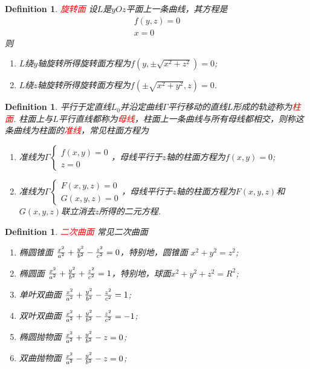 \documentclass{article}
\newtheorem{definition}[theorem]{Definition}
\newcommand{\redt}[1]{\textcolor{red}{#1}}
\begin{document}
\begin{definition}
\rm \redt{旋转面} 设$L$是$yOz$平面上一条曲线，其方程是
$$
\begin{array}{ll}
f(y,z) = 0 \\
x= 0
\end{array}
$$
则
\begin{enumerate}
	\item $L$绕$y$轴旋转所得旋转面方程为$f(y,\pm \sqrt{x^2+z^2}) = 0$;
	\item $L$绕$z$轴旋转所得旋转面方程为$f(\pm \sqrt{x^2 + y^2},z) = 0$. 
\end{enumerate}
\end{definition}

\begin{definition}
\rm 平行于定直线$L_0$并沿定曲线$\Gamma$平行移动的直线$L$形成的轨迹称为\redt{柱面}. 柱面上与$L$平行直线都称为\redt{母线}，柱面上一条曲线与所有母线都相交，则称这条曲线为柱面的\redt{准线}，常见柱面方程为
\begin{enumerate}
	\item 准线为$\Gamma \left\{ \begin{array}{ll} f(x,y) = 0 \\ z = 0 \end{array} \right.$，母线平行于$z$轴的柱面方程为$f(x,y) = 0$;
	\item 准线为$\Gamma \left\{\begin{array}{ll} F(x,y,z) = 0 \\ G(x,y,z) = 0 \end{array}\right.$，母线平行于$z$轴的柱面方程为$F(x,y,z)$和$G(x,y,z)$联立消去$z$所得的二元方程. 
\end{enumerate}
\end{definition}

\begin{definition}
\rm \redt{二次曲面} 常见二次曲面
\begin{enumerate}
	\item 椭圆锥面 ${x^{2} \over a^{2}}+{y^{2} \over b^{2}}-{z^{2} \over c^{2}}=0$，特别地，圆锥面 $x^2 + y^2 = z^2$;
	\item 椭圆面 ${x^{2} \over a^{2}}+{y^{2} \over b^{2}}+{z^{2} \over c^{2}}=1$，特别地，球面$x^2+y^2+z^2 = R^2$;
	\item 单叶双曲面 ${x^{2} \over a^{2}}+{y^{2} \over b^{2}}-{z^{2} \over c^{2}}=1$;
	\item 双叶双曲面 ${x^{2} \over a^{2}}+{y^{2} \over b^{2}}-{z^{2} \over c^{2}}=-1$;
	\item 椭圆抛物面 ${x^{2} \over a^{2}}+{y^{2} \over b^{2}}-z=0$;
	\item 双曲抛物面 ${x^{2} \over a^{2}}-{y^{2} \over b^{2}}-z=0$;
\end{enumerate}
\end{definition}
\end{document}
